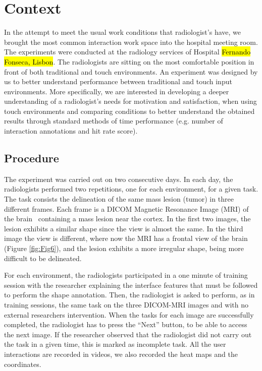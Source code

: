 \documentclass{sigchi}
\begin{document}
\section{Context}

In the attempt to meet the usual work conditions that radiologist's have,  we brought the most common interaction work space into the hospital meeting room. The experiments were conducted at the radiology services of Hospital \hl{Fernando Fonseca, Lisbon}. The radiologists are sitting on the most comfortable position in front of both traditional and touch environments. An experiment was designed by us to better understand performance between traditional and touch input environments. More specifically, we are interested in developing a deeper understanding of a radiologist's needs for motivation and satisfaction, when using touch environments and comparing conditions to better understand the obtained results through standard methods of time performance (e.g. number of interaction annotations and hit rate score).

\subsection{Procedure}

The experiment was carried out on two consecutive days. In each day, the  radiologists performed two repetitions, one for each environment, for a given task. The task consists the delineation of the same mass lesion (tumor) in three different frames. Each frame is a DICOM Magnetic Resonance Image (MRI) of the brain~\cite{mildenberger2002introduction} containing a mass lesion near the cortex. In the first two images, the lesion exhibits a similar shape since the view is almost the same. In the third image the view is different, where now the MRI has a frontal view of the brain (Figure \ref{fig:Fig6}), and the lesion exhibits a more irregular shape, being more difficult to be delineated.
 
For each environment, the radiologists participated in a one minute of training session with the researcher explaining the interface features that must be followed to perform the shape annotation. Then, the radiologist is asked to perform, as in training sessions, the same task on the three DICOM-MRI images and with no external researchers intervention. When the tasks for each image are successfully completed, the radiologist has to press the ``Next'' button, to be able to access the next image. If the researcher observed that the radiologist did not carry out the task in a given time, this is marked as incomplete task. All the user interactions are recorded in videos, we also recorded the heat maps 
and the coordinates. 
\end{document}

